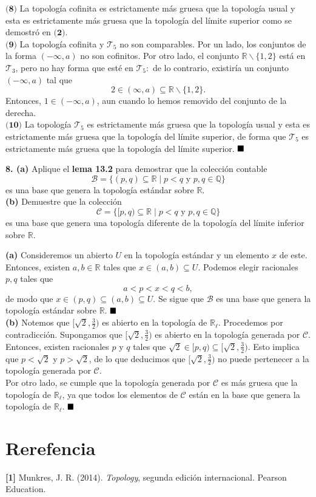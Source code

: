 \documentclass{article}
\begin{document}
$\textbf{(8)}$ La topología cofinita es estrictamente más gruesa que la topología usual y esta es estrictamente más gruesa que la topología del límite superior como se demostró en $\textbf{(2)}$.\\ 
\newpage
$\textbf{(9)}$ La topología cofinita y $\mathcal{T}_{5}$ no son comparables. Por un lado, los conjuntos de la forma $(- \infty, a)$ no son cofinitos. Por otro lado, el conjunto $\mathbb{R} \backslash \{ 1, 2\}$ está en $\mathcal{T}_{3}$, pero no hay forma que esté en $\mathcal{T}_{5}: $ de lo contrario, existiría un conjunto $(-\infty, a)$ tal que
$$  2 \in (\infty, a) \subseteq \mathbb{R} \backslash \{1, 2 \}.$$ 
Entonces, $1 \in (- \infty, a)$, aun cuando lo hemos removido del conjunto de la derecha. \\

$\textbf{(10)}$ La topología $\mathcal{T}_{5}$ es estrictamente más gruesa que la topología usual y esta es estrictamente más gruesa que la topología del límite superior, de forma que $\mathcal{T}_{5}$ es estrictamente más gruesa que la topología del límite superior. $\hspace*{\fill} \blacksquare$\\
 

\begin{mybox}
\textbf{8. (a)} Aplique el \textbf{lema 13.2} para demostrar que la colección contable 
$$ \mathcal{B} = \{ (p, q) \subseteq \mathbb{R} \mid p < q \text{ y } p, q \in \mathbb{Q} \} $$
es una base que genera la topología estándar sobre $\mathbb{R}$.	\\

\textbf{(b) }Demuestre que la colección 
$$ \mathcal{C} = \{ [p, q) \subseteq \mathbb{R} \mid p < q \text{ y }p, q \in \mathbb{Q} \} $$
es una base que genera una topología diferente de la topología del límite inferior sobre $\mathbb{R}$.
\end{mybox}	

\textbf{(a)} Consideremos un abierto $U$ en la topología estándar y un elemento $x$ de este. Entonces, existen $a, b \in \mathbb{R}$ tales que $x \in (a, b) \subseteq U$. Podemos elegir racionales $p, q$ tales que 
$$ a < p < x < q < b ,$$
de modo que $x \in (p, q) \subseteq (a, b ) \subseteq U.$ Se sigue que $\mathcal{B}$ es una base que genera la topología estándar sobre $\mathbb{R}$. $\hspace*{\fill} \blacksquare$\\

\textbf{(b) } Notemos que $[\sqrt{2}, \frac{3}{2})$ es abierto en la topología de $\mathbb{R}_{\ell}$. Procedemos por contradicción. Supongamos que $[\sqrt{2}, \frac{3}{2})$ es abierto en la topología generada por $\mathcal{C}$. Entonces, existen racionales $p$ y $q$ tales que $\sqrt{2} \in [p, q) \subseteq [\sqrt{2}, \frac{3}{2})$. Esto implica que $p < \sqrt{2}$ y $p > \sqrt{2}$, de lo que deducimos que $[\sqrt{2}, \frac{3}{2})$ no puede pertenecer a la topología generada por $\mathcal{C}$. \\
Por otro lado, se cumple que la topología generada por $\mathcal{C}$ es más gruesa que la topología de $\mathbb{R}_{\ell}$, ya que todos los elementos de $\mathcal{C}$ están en la base que genera la topología de $\mathbb{R}_{\ell}$. $\hspace*{\fill} \blacksquare$
\section*{Rerefencia}
\textbf{[1]} Munkres, J. R. (2014). \textit{Topology}, segunda edición internacional. Pearson Education. 
\end{document}
